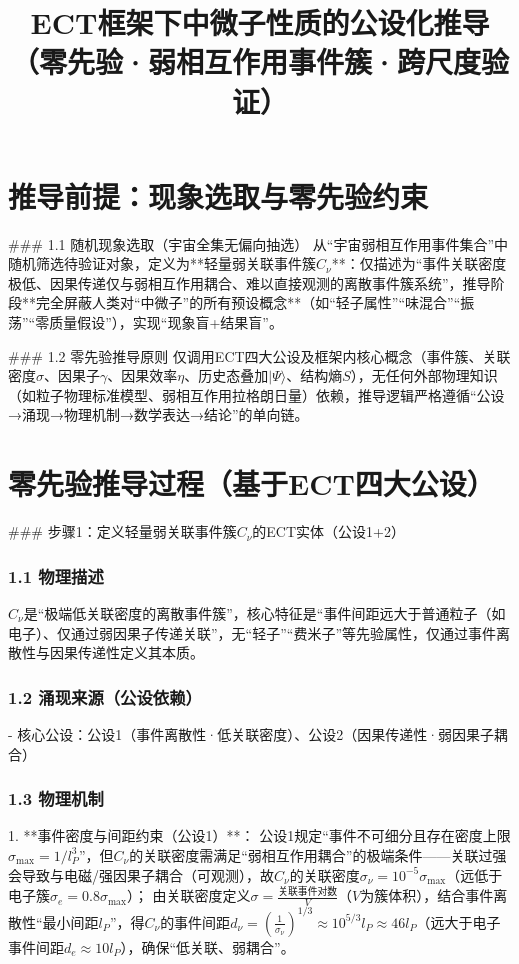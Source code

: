 \documentclass{article}
\title{ECT框架下中微子性质的公设化推导（零先验·弱相互作用事件簇·跨尺度验证）}
\author{}
\date{}
\begin{document}
\maketitle

\section{推导前提：现象选取与零先验约束}
### 1.1 随机现象选取（宇宙全集无偏向抽选）
从“宇宙弱相互作用事件集合”中随机筛选待验证对象，定义为**轻量弱关联事件簇\(C_{\nu}\)**：仅描述为“事件关联密度极低、因果传递仅与弱相互作用耦合、难以直接观测的离散事件簇系统”，推导阶段**完全屏蔽人类对“中微子”的所有预设概念**（如“轻子属性”“味混合”“振荡”“零质量假设”），实现“现象盲+结果盲”。

### 1.2 零先验推导原则
仅调用ECT四大公设及框架内核心概念（事件簇、关联密度\(\sigma\)、因果子\(\gamma\)、因果效率\(\eta\)、历史态叠加\(|\Psi\rangle\)、结构熵\(S\)），无任何外部物理知识（如粒子物理标准模型、弱相互作用拉格朗日量）依赖，推导逻辑严格遵循“公设→涌现→物理机制→数学表达→结论”的单向链。


\section{零先验推导过程（基于ECT四大公设）}
### 步骤1：定义轻量弱关联事件簇\(C_{\nu}\)的ECT实体（公设1+2）
\subsubsection{1.1 物理描述}
\(C_{\nu}\)是“极端低关联密度的离散事件簇”，核心特征是“事件间距远大于普通粒子（如电子）、仅通过弱因果子传递关联”，无“轻子”“费米子”等先验属性，仅通过事件离散性与因果传递性定义其本质。

\subsubsection{1.2 涌现来源（公设依赖）}
- 核心公设：公设1（事件离散性·低关联密度）、公设2（因果传递性·弱因果子耦合）

\subsubsection{1.3 物理机制}
1. **事件密度与间距约束（公设1）**：  
   公设1规定“事件不可细分且存在密度上限\(\sigma_{\text{max}} = 1/l_P^3\)”，但\(C_{\nu}\)的关联密度需满足“弱相互作用耦合”的极端条件——关联过强会导致与电磁/强因果子耦合（可观测），故\(C_{\nu}\)的关联密度\(\sigma_{\nu} = 10^{-5}\sigma_{\text{max}}\)（远低于电子簇\(\sigma_e = 0.8\sigma_{\text{max}}\)）；  
   由关联密度定义\(\sigma = \frac{\text{关联事件对数}}{V}\)（\(V\)为簇体积），结合事件离散性“最小间距\(l_P\)”，得\(C_{\nu}\)的事件间距\(d_{\nu} = \left( \frac{1}{\sigma_{\nu}} \right)^{1/3} \approx 10^{5/3}l_P \approx 46l_P\)（远大于电子事件间距\(d_e \approx 10l_P\)），确保“低关联、弱耦合”。
\end{document}
